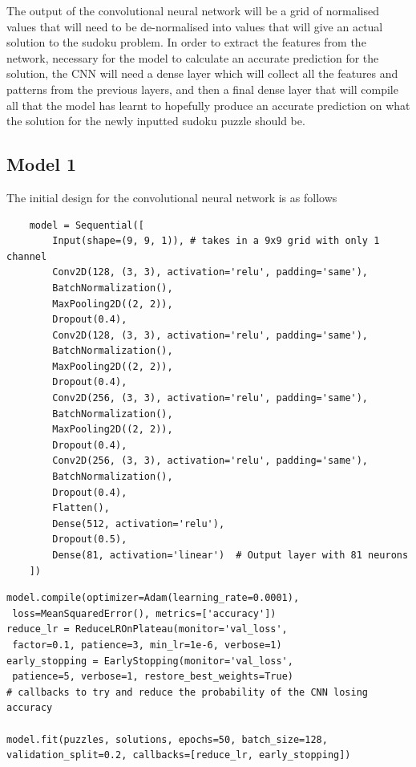 \documentclass[]{final_report}
\begin{document}
The output of the convolutional neural network will be a grid of normalised values that will need to be de-normalised into values that will give an actual solution to the sudoku problem. In order to extract the features from the network, necessary for the model to calculate an accurate prediction for the solution, the CNN will need a dense layer which will collect all the features and patterns from the previous layers, and then a final dense layer that will compile all that the model has learnt to hopefully produce an accurate prediction on what the solution for the newly inputted sudoku puzzle should be. 

\subsection{Model 1}

The initial design for the convolutional neural network is as follows 

\begin{verbatim}
    model = Sequential([
        Input(shape=(9, 9, 1)), # takes in a 9x9 grid with only 1 channel
        Conv2D(128, (3, 3), activation='relu', padding='same'),
        BatchNormalization(),
        MaxPooling2D((2, 2)),
        Dropout(0.4),
        Conv2D(128, (3, 3), activation='relu', padding='same'),
        BatchNormalization(),
        MaxPooling2D((2, 2)),
        Dropout(0.4),
        Conv2D(256, (3, 3), activation='relu', padding='same'),
        BatchNormalization(),
        MaxPooling2D((2, 2)),
        Dropout(0.4),
        Conv2D(256, (3, 3), activation='relu', padding='same'),
        BatchNormalization(),
        Dropout(0.4),
        Flatten(),
        Dense(512, activation='relu'),
        Dropout(0.5),
        Dense(81, activation='linear')  # Output layer with 81 neurons
    ])
\end{verbatim}

\begin{verbatim}
model.compile(optimizer=Adam(learning_rate=0.0001), 
 loss=MeanSquaredError(), metrics=['accuracy'])
reduce_lr = ReduceLROnPlateau(monitor='val_loss',
 factor=0.1, patience=3, min_lr=1e-6, verbose=1)
early_stopping = EarlyStopping(monitor='val_loss',
 patience=5, verbose=1, restore_best_weights=True)
# callbacks to try and reduce the probability of the CNN losing accuracy

model.fit(puzzles, solutions, epochs=50, batch_size=128, 
validation_split=0.2, callbacks=[reduce_lr, early_stopping])
\end{verbatim}
\end{document}
